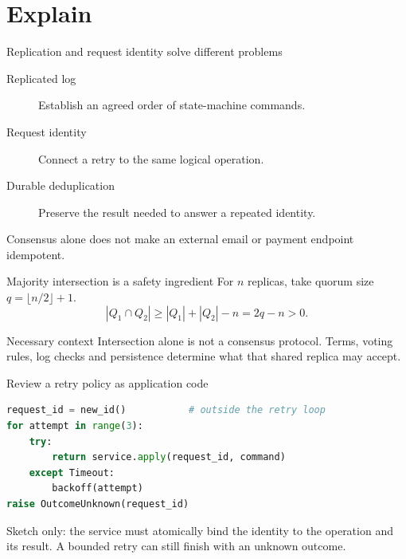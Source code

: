 \documentclass[10pt,aspectratio=169]{beamer}
\begin{document}
\section{Explain}
\begin{frame}{Replication and request identity solve different problems}
\begin{description}
\item[Replicated log] Establish an agreed order of state-machine commands.
\item[Request identity] Connect a retry to the same logical operation.
\item[Durable deduplication] Preserve the result needed to answer a repeated identity.
\end{description}
Consensus alone does not make an external email or payment endpoint idempotent.
\end{frame}
\begin{frame}{Majority intersection is a safety ingredient}
For $n$ replicas, take quorum size $q=\lfloor n/2\rfloor+1$.
\[
 |Q_1\cap Q_2|\geq |Q_1|+|Q_2|-n=2q-n>0.
\]
\pause
\begin{alertblock}{Necessary context}
Intersection alone is not a consensus protocol. Terms, voting rules, log checks and persistence determine what that shared replica may accept.
\end{alertblock}
\end{frame}
\begin{frame}[fragile]{Review a retry policy as application code}
\begin{lstlisting}[language=Python]
request_id = new_id()           # outside the retry loop
for attempt in range(3):
    try:
        return service.apply(request_id, command)
    except Timeout:
        backoff(attempt)
raise OutcomeUnknown(request_id)
\end{lstlisting}
\small Sketch only: the service must atomically bind the identity to the operation and its result. A bounded retry can still finish with an unknown outcome.
\end{frame}
\end{document}
